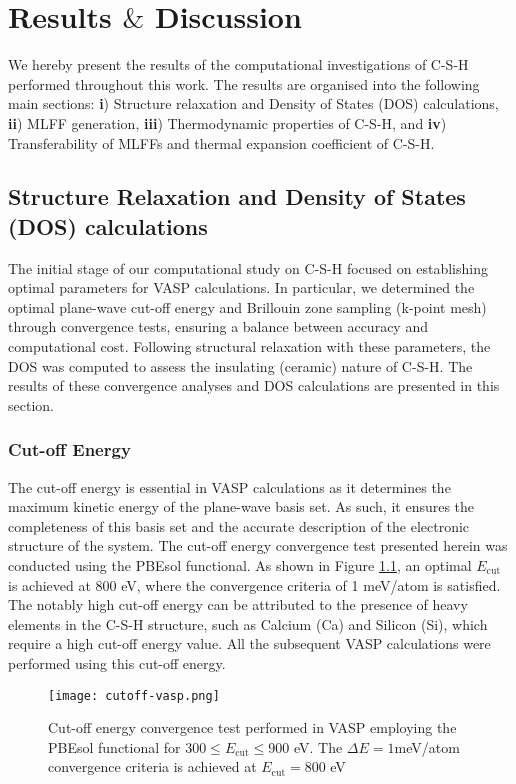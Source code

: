 \chapter{\texorpdfstring{Results $\&$ Discussion}{Results \& Discussion}}
\label{Chapter4}
We hereby present the results of the computational investigations of C-S-H performed throughout this work. The results are organised into the following main sections: \textbf{i}) Structure relaxation and Density of States (DOS) calculations, \textbf{ii}) MLFF generation, \textbf{iii}) Thermodynamic properties of C-S-H, and \textbf{iv}) Transferability of MLFFs and thermal expansion coefficient of C-S-H. 
 
\section{Structure Relaxation and Density of States (DOS) calculations}
\label{sec:bulk-params-dos}
The initial stage of our computational study on C-S-H focused on establishing optimal parameters for VASP calculations. In particular, we determined the optimal plane-wave cut-off energy and Brillouin zone sampling (k-point mesh) through convergence tests, ensuring a balance between accuracy and computational cost. Following structural relaxation with these parameters, the DOS was computed to assess the insulating (ceramic) nature of C-S-H. The results of these convergence analyses and DOS calculations are presented in this section.
\subsection{Cut-off Energy}
The cut-off energy is essential in VASP calculations as it determines the maximum kinetic energy of the plane-wave basis set. As such, it ensures the completeness of this basis set and the accurate description of the electronic structure of the system.  The cut-off energy convergence test presented herein was conducted using the PBEsol functional. As shown in Figure \ref{cutoff-energy}, an optimal $E_{\text{cut}}$ is achieved at 800 eV, where the convergence criteria of 1 meV/atom is satisfied. The notably high cut-off energy can be attributed to the presence of heavy elements in the C-S-H structure, such as Calcium (Ca) and Silicon (Si), which require a high cut-off energy value\supercite{zotero-item-698}. All the subsequent VASP calculations were performed using this cut-off energy.
\begin{figure}[H]
    \centering
    \texttt{[image: cutoff-vasp.png]}
    \caption{
    Cut-off energy convergence test performed in VASP employing the PBEsol functional for $300 \leq E_{\text{cut}} \leq 900$ eV. The $\Delta E = 1$meV/atom convergence criteria is achieved at $E_{\text {cut}} = 800$ eV}
    \label{cutoff-energy}
\end{figure}

